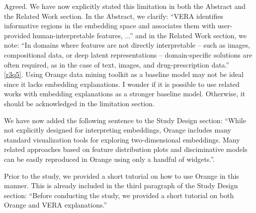 \documentclass[11pt]{article}
\newcounter{rtaskno}
\newcommand{\rtask}[1]{\refstepcounter{rtaskno}\label{#1}}
\newcommand{\reviewc}[2]{\begin{leftbar}\noindent\rtask{#1}\ref{#1}. #2\end{leftbar}\vspace*{-4mm}}
\newcommand{\answer}[1]{\noindent #1\\[8mm]}
\newlength{\leftbarwidth}
\newlength{\leftbarsep}
\renewenvironment{leftbar}{%
    \def\FrameCommand{{\color{black}{\vrule width \leftbarwidth\relax\hspace {\leftbarsep}}}}%
    \MakeFramed {\advance \hsize -\width \FrameRestore }%
}{\endMakeFramed}
\begin{document}
\answer{Agreed. We have now explicitly stated this limitation in both the Abstract and the Related Work section. In the Abstract, we clarify: ``VERA identifies informative regions in the embedding space and associates them with user-provided human-interpretable features, ...'' and in the Related Work section, we note: ``In domains where features are not directly interpretable -- such as images, compositional data, or deep latent representations -- domain-specific solutions are often required, as in the case of text, images, and drug-prescription data.''}





\reviewc{r3q5}{Using Orange data mining toolkit as a baseline model may not be ideal since it lacks embedding explanations. I wonder if it is possible to use related works with embedding explanations as a stronger baseline model. Otherwise, it should be acknowledged in the limitation section.}

\answer{We have now added the following sentence to the Study Design section: ``While not explicitly designed for interpreting embeddings, Orange includes many standard visualization tools for exploring two-dimensional embeddings. Many related approaches based on feature distribution plots and disciminative models can be easily reproduced in Orange using only a handful of widgets.''.

Prior to the study, we provided a short tutorial on how to use Orange in this manner. This is already included in the third paragraph of the Study Design section: ``Before conducting the study, we provided a short tutorial on both Orange and VERA explanations.''}





%
%
\end{document}
